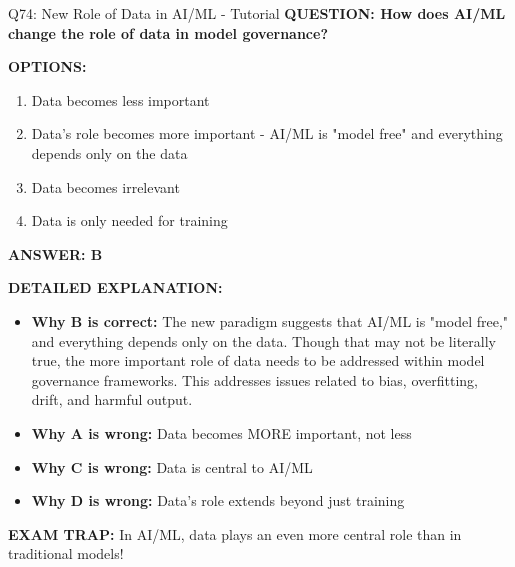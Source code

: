 \documentclass[8pt]{beamer}
\begin{document}
	\begin{frame}{Q74: New Role of Data in AI/ML - Tutorial}
		\fontsize{6.5}{7.5}\selectfont
		\textbf{QUESTION: How does AI/ML change the role of data in model governance?}
		
		\vspace{0.1cm}
		\textbf{OPTIONS:}
		\begin{enumerate}
			\item Data becomes less important
			\item Data's role becomes more important - AI/ML is "model free" and everything depends only on the data
			\item Data becomes irrelevant
			\item Data is only needed for training
		\end{enumerate}
		
		\vspace{0.1cm}
		\textcolor{myblue}{\textbf{ANSWER: B}}
		
		\vspace{0.1cm}
		\textbf{DETAILED EXPLANATION:}
		\begin{itemize}
			\item \textbf{Why B is correct:} The new paradigm suggests that AI/ML is "model free," and everything depends only on the data. Though that may not be literally true, the more important role of data needs to be addressed within model governance frameworks. This addresses issues related to bias, overfitting, drift, and harmful output.
			\item \textbf{Why A is wrong:} Data becomes MORE important, not less
			\item \textbf{Why C is wrong:} Data is central to AI/ML
			\item \textbf{Why D is wrong:} Data's role extends beyond just training
		\end{itemize}
		
		\textcolor{myred}{\textbf{EXAM TRAP:}} In AI/ML, \textcolor{myblue}{data plays an even more central role} than in traditional models!
	\end{frame}
	
\end{document}
